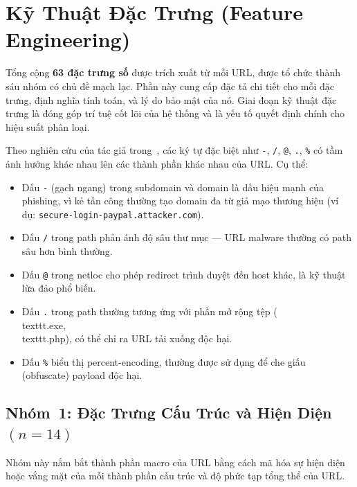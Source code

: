 \documentclass[a4paper,12pt]{article}
\begin{document}
\section{Kỹ Thuật Đặc Trưng (Feature Engineering)}
\label{sec:features}

Tổng cộng \textbf{63 đặc trưng số} được trích xuất từ mỗi URL, được tổ chức thành sáu nhóm có chủ đề mạch lạc. Phần này cung cấp đặc tả chi tiết cho mỗi đặc trưng, định nghĩa tính toán, và lý do bảo mật của nó. Giai đoạn kỹ thuật đặc trưng là đóng góp trí tuệ cốt lõi của hệ thống và là yếu tố quyết định chính cho hiệu suất phân loại.

Theo nghiên cứu của tác giả trong~\cite{deeplearning_phishing}, các ký tự đặc biệt như \texttt{-}, \texttt{/}, \texttt{@}, \texttt{.}, \texttt{\%} có tầm ảnh hưởng khác nhau lên các thành phần khác nhau của URL. Cụ thể:
\begin{itemize}
    \item Dấu \texttt{-} (gạch ngang) trong subdomain và domain là dấu hiệu mạnh của phishing, vì kẻ tấn công thường tạo domain đa từ giả mạo thương hiệu (ví dụ: \texttt{secure-login-paypal.attacker.com}).
    \item Dấu \texttt{/} trong path phản ánh độ sâu thư mục --- URL malware thường có path sâu hơn bình thường.
    \item Dấu \texttt{@} trong netloc cho phép redirect trình duyệt đến host khác, là kỹ thuật lừa đảo phổ biến.
    \item Dấu \texttt{.} trong path thường tương ứng với phần mở rộng tệp (\\texttt{.exe}, \\texttt{.php}), có thể chỉ ra URL tải xuống độc hại.
    \item Dấu \texttt{\%} biểu thị percent-encoding, thường được sử dụng để che giấu (obfuscate) payload độc hại.
\end{itemize}

\subsection{Nhóm~1: Đặc Trưng Cấu Trúc và Hiện Diện \texorpdfstring{$(n=14)$}{(n=14)}}
\label{sec:feat_structural}

Nhóm này nắm bắt thành phần macro của URL bằng cách mã hóa sự hiện diện hoặc vắng mặt của mỗi thành phần cấu trúc và độ phức tạp tổng thể của URL.
\end{document}
